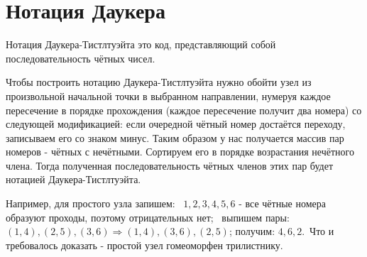 \section{Нотация Даукера}

Нотация Даукера-Тистлтуэйта это код, представляющий собой последовательность чётных чисел.

Чтобы построить нотацию Даукера-Тистлтуэйта нужно обойти узел из произвольной начальной точки в выбранном направлении, нумеруя каждое пересечение в порядке прохождения (каждое пересечение получит два номера) со следующей модификацией: если очередной чётный номер достаётся переходу, записываем его со знаком минус. Таким образом у нас получается массив пар номеров - чётных с нечётными. Сортируем его в порядке возрастания нечётного члена. Тогда полученная последовательность чётных членов этих пар будет нотацией Даукера-Тистлтуэйта.

Например, для простого узла запишем: \
$1,2,3,4,5,6$ - все чётные номера образуют проходы, поэтому отрицательных нет; \
выпишем пары: $(1,4),(2,5),(3,6) \Rightarrow (1,4),(3,6),(2,5)$;
получим: $4,6,2$.\
Что и требовалось доказать - простой узел гомеоморфен трилистнику.